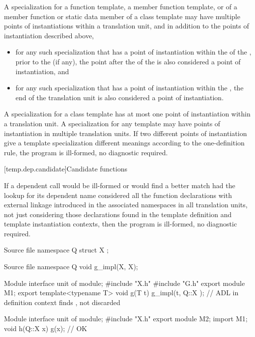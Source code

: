 \pnum
A specialization for a function template, a member function template,
or of a member function or static data member of a class template may have
multiple points of instantiations within a translation unit, and in addition
to the points of instantiation described above,
\begin{itemize}
\item
for any such
specialization that has a point of instantiation within the
 of the
,
prior to the  (if any),
the point after the 
of the 
is also considered a point of instantiation,
and
\item
for any such specialization that has a point of instantiation
within the ,
the end of the translation unit is also
considered a point of instantiation.
\end{itemize}
A specialization for a class template has at most one point of instantiation
within a translation unit.
A specialization for any template may have points of instantiation in multiple
translation units.
If two different points of instantiation give a template specialization
different meanings according to the one-definition rule,
the program is ill-formed, no diagnostic required.

[temp.dep.candidate]{Candidate functions}

\pnum
{}%
If a dependent call would be ill-formed or
would find a better match had the lookup for its dependent name
considered all the function declarations with external linkage
introduced in the associated namespaces in all translation units,
not just considering those declarations found in the template definition and
template instantiation contexts,
then the program is ill-formed, no diagnostic required.

\pnum
\begin{example}
\begin{codeblocktu}{Source file }
namespace Q {
  struct X { };
}
\end{codeblocktu}

\begin{codeblocktu}{Source file }
namespace Q {
  void g_impl(X, X);
}
\end{codeblocktu}

\begin{codeblocktu}{Module interface unit of }
module;
#include "X.h"
#include "G.h"
export module M1;
export template<typename T>
void g(T t) {
  g_impl(t, Q::X{ });   // ADL in definition context finds ,  not discarded
}
\end{codeblocktu}

\begin{codeblocktu}{Module interface unit of }
module;
#include "X.h"
export module M2;
import M1;
void h(Q::X x) {
   g(x);                // OK
}
\end{codeblocktu}
\end{example}

